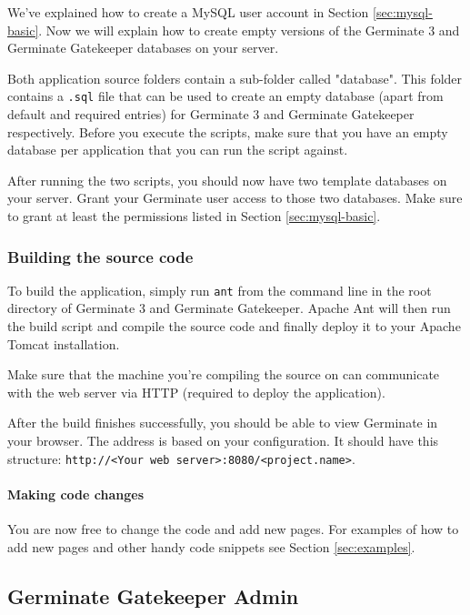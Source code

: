 We've explained how to create a MySQL user account in Section \ref{sec:mysql-basic}. Now we will explain how to create empty versions of the Germinate 3 and Germinate Gatekeeper databases on your server.

Both application source folders contain a sub-folder called "database". This folder contains a \texttt{.sql} file that can be used to create an empty database (apart from default and required entries) for Germinate 3 and Germinate Gatekeeper respectively. Before you execute the scripts, make sure that you have an empty database per application that you can run the script against.

After running the two scripts, you should now have two template databases on your server. Grant your Germinate user access to those two databases. Make sure to grant at least the permissions listed in Section \ref{sec:mysql-basic}.

\subsubsection{Building the source code}
To build the application, simply run \texttt{ant} from the command line in the root directory of Germinate 3 and Germinate Gatekeeper. Apache Ant will then run the build script and compile the source code and finally deploy it to your Apache Tomcat installation.

Make sure that the machine you're compiling the source on can communicate with the web server via HTTP (required to deploy the application).

After the build finishes successfully, you should be able to view Germinate in your browser. The address is based on your configuration. It should have this structure: \texttt{http://<Your web server>:8080/<project.name>}.

\paragraph{Making code changes}
You are now free to change the code and add new pages. For examples of how to add new pages and other handy code snippets see Section \ref{sec:examples}.

\subsection{Germinate Gatekeeper Admin}
\label{subsection:gatekeeper-admin}

